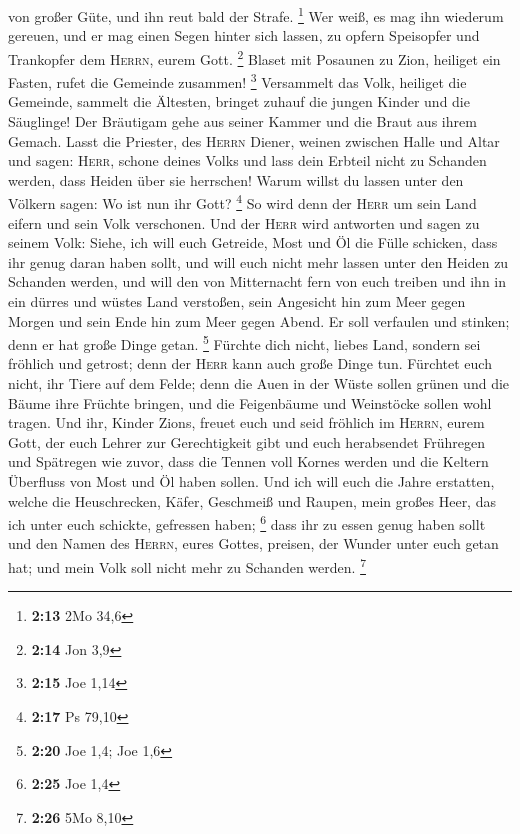 von großer Güte, und ihn reut bald der Strafe. \footnote{\textbf{2:13}
  2Mo 34,6}  Wer weiß, es mag ihn wiederum gereuen, und
er mag einen Segen hinter sich lassen, zu opfern Speisopfer und
Trankopfer dem \textsc{Herrn}, eurem Gott. \footnote{\textbf{2:14} Jon
  3,9}  Blaset mit Posaunen zu Zion, heiliget ein Fasten,
rufet die Gemeinde zusammen! \footnote{\textbf{2:15} Joe 1,14}
 Versammelt das Volk, heiliget die Gemeinde, sammelt die
Ältesten, bringet zuhauf die jungen Kinder und die Säuglinge! Der
Bräutigam gehe aus seiner Kammer und die Braut aus ihrem Gemach.
 Lasst die Priester, des \textsc{Herrn} Diener, weinen
zwischen Halle und Altar und sagen: \textsc{Herr}, schone deines Volks
und lass dein Erbteil nicht zu Schanden werden, dass Heiden über sie
herrschen! Warum willst du lassen unter den Völkern sagen: Wo ist nun
ihr Gott? \footnote{\textbf{2:17} Ps 79,10}  So wird denn
der \textsc{Herr} um sein Land eifern und sein Volk verschonen.
 Und der \textsc{Herr} wird antworten und sagen zu seinem
Volk: Siehe, ich will euch Getreide, Most und Öl die Fülle schicken,
dass ihr genug daran haben sollt, und will euch nicht mehr lassen unter
den Heiden zu Schanden werden,  und will den von
Mitternacht fern von euch treiben und ihn in ein dürres und wüstes Land
verstoßen, sein Angesicht hin zum Meer gegen Morgen und sein Ende hin
zum Meer gegen Abend. Er soll verfaulen und stinken; denn er hat große
Dinge getan. \footnote{\textbf{2:20} Joe 1,4; Joe 1,6} 
Fürchte dich nicht, liebes Land, sondern sei fröhlich und getrost; denn
der \textsc{Herr} kann auch große Dinge tun.  Fürchtet
euch nicht, ihr Tiere auf dem Felde; denn die Auen in der Wüste sollen
grünen und die Bäume ihre Früchte bringen, und die Feigenbäume und
Weinstöcke sollen wohl tragen.  Und ihr, Kinder Zions,
freuet euch und seid fröhlich im \textsc{Herrn}, eurem Gott, der euch
Lehrer zur Gerechtigkeit gibt und euch herabsendet Frühregen und
Spätregen wie zuvor,  dass die Tennen voll Kornes werden
und die Keltern Überfluss von Most und Öl haben sollen. 
Und ich will euch die Jahre erstatten, welche die Heuschrecken, Käfer,
Geschmeiß und Raupen, mein großes Heer, das ich unter euch schickte,
gefressen haben; \footnote{\textbf{2:25} Joe 1,4}  dass
ihr zu essen genug haben sollt und den Namen des \textsc{Herrn}, eures
Gottes, preisen, der Wunder unter euch getan hat; und mein Volk soll
nicht mehr zu Schanden werden. \footnote{\textbf{2:26} 5Mo 8,10}
